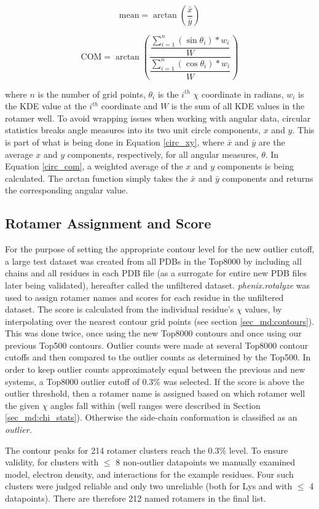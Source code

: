 \begin{equation}
\textrm{mean} = \arctan\left (
\frac{\bar{x}}{\bar{y}}
\right )
\label{circ_m}
\end{equation}

\begin{equation}
\textrm{COM} = \arctan\left (
  \dfrac{
    \dfrac{\sum_{i=1}^{n}\left ( \sin \theta_{i} \right )\ast w_{i}}{W}
  }{
    \dfrac{\sum_{i=1}^{n} \left ( \cos \theta_{i} \right )\ast w_{i}}{W}
  }
\right )
\label{circ_com}
\end{equation}

\noindent where $n$ is the number of grid points, $\theta_{i}$ is the $i^{th}$ $\chi$ coordinate in radians, $w_{i}$ is the KDE value at the $i^{th}$ coordinate and $W$ is the sum of all KDE values in the rotamer well. To avoid wrapping issues when working with angular data, circular statistics breaks angle measures into its two unit circle components, $x$ and $y$. This is part of what is being done in Equation \ref{circ_xy}, where $\bar{x}$ and $\bar{y}$ are the average $x$ and $y$ components, respectively, for all angular measures, $\theta$. In Equation \ref{circ_com}, a weighted average of the $x$ and $y$ components is being calculated. The arctan function simply takes the $\bar{x}$ and $\bar{y}$ components and returns the corresponding angular value.

\subsection{Rotamer Assignment and Score}
\label{sec_md:rotaassign}
For the purpose of setting the appropriate contour level for the new outlier cutoff, a large test dataset was created from all PDBs in the Top8000 by including all chains and all residues in each PDB file (as a surrogate for entire new PDB files later being validated), hereafter called the unfiltered dataset. \textit{phenix.rotalyze} was used to assign rotamer names and scores for each residue in the unfiltered dataset. The score is calculated from the individual residue's $\chi$ values, by interpolating over the nearest contour grid points (see section \ref{sec_md:contours}). This was done twice, once using the new Top8000 contours and once using our previous Top500 contours. \textcolor{changecolor}{Outlier counts were made at several Top8000 contour cutoffs and then compared to the outlier counts as determined by the Top500. In order to keep outlier counts approximately equal between the previous and new systems, a Top8000 outlier cutoff of 0.3\% was selected.} If the score is above the outlier threshold, then a rotamer name is assigned based on which rotamer well the given $\chi$ angles fall within (well ranges were described in Section \ref{sec_md:chi_stats}). Otherwise the side-chain conformation is classified as an \textit{outlier.}

\textcolor{changecolor}{The contour peaks for 214 rotamer clusters reach the 0.3\% level. To ensure validity, for clusters with $\le$ 8 non-outlier datapoints we manually examined model, electron density, and interactions for the example residues. Four such clusters were judged reliable and only two unreliable (both for Lys and with $\le$ 4 datapoints). There are therefore 212 named rotamers in the final list.}
